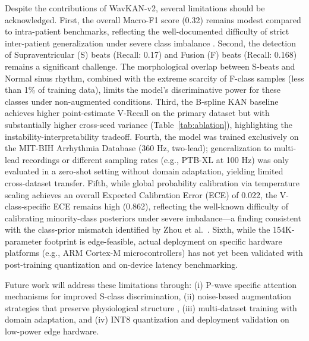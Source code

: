 \documentclass[journal,twoside,web]{ieeecolor}
\begin{document}
Despite the contributions of WavKAN-v2, several limitations should be acknowledged. First, the overall Macro-F1 score (0.32) remains modest compared to intra-patient benchmarks, reflecting the well-documented difficulty of strict inter-patient generalization under severe class imbalance \cite{bahrami_investigation_2025, xiao_deep_2023}. Second, the detection of Supraventricular (S) beats (Recall: 0.17) and Fusion (F) beats (Recall: 0.168) remains a significant challenge. The morphological overlap between S-beats and Normal sinus rhythm, combined with the extreme scarcity of F-class samples (less than 1\% of training data), limits the model's discriminative power for these classes under non-augmented conditions. Third, the B-spline KAN baseline achieves higher point-estimate V-Recall on the primary dataset but with substantially higher cross-seed variance (Table~\ref{tab:ablation}), highlighting the instability-interpretability tradeoff. Fourth, the model was trained exclusively on the MIT-BIH Arrhythmia Database (360 Hz, two-lead); generalization to multi-lead recordings or different sampling rates (e.g., PTB-XL at 100 Hz) was only evaluated in a zero-shot setting without domain adaptation, yielding limited cross-dataset transfer. Fifth, while global probability calibration via temperature scaling achieves an overall Expected Calibration Error (ECE) of 0.022, the V-class-specific ECE remains high (0.862), reflecting the well-known difficulty of calibrating minority-class posteriors under severe imbalance---a finding consistent with the class-prior mismatch identified by Zhou et al.~\cite{zhou_inter-patient_2024}. Sixth, while the 154K-parameter footprint is edge-feasible, actual deployment on specific hardware platforms (e.g., ARM Cortex-M microcontrollers) has not yet been validated with post-training quantization and on-device latency benchmarking.

Future work will address these limitations through: (i) P-wave specific attention mechanisms for improved S-class discrimination, (ii) noise-based augmentation strategies that preserve physiological structure \cite{zhou_inter-patient_2024}, (iii) multi-dataset training with domain adaptation, and (iv) INT8 quantization and deployment validation on low-power edge hardware.

\end{document}
